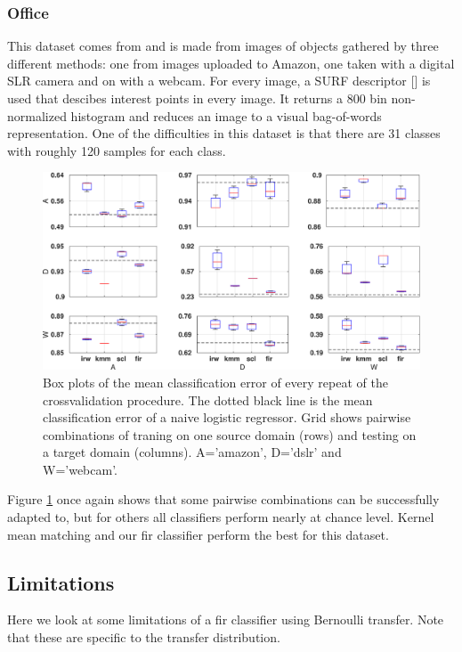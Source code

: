 \documentclass[twoside,11pt]{article}
\begin{document}
\subsubsection{Office}
This dataset comes from \cite{saenko2010adapting} and is made from images of objects gathered by three different methods: one from images uploaded to Amazon, one taken with a digital SLR camera and on with a webcam. For every image, a SURF descriptor [\cite{bay2006surf}] is used that descibes interest points in every image. It returns a 800 bin non-normalized histogram and reduces an image to a visual bag-of-words representation. One of the difficulties in this dataset is that there are 31 classes with roughly 120 samples for each class. 

\begin{figure}[ht]
	\centering
	\includegraphics[width=1\textwidth]{images/err_office_box.eps}
	\caption{Box plots of the mean classification error of every repeat of the crossvalidation procedure. The dotted black line is the mean classification error of a naive logistic regressor. Grid shows pairwise combinations of traning on one source domain (rows) and testing on a target domain (columns). A='amazon', D='dslr' and W='webcam'.}
	\label{err_office3}
\end{figure}

Figure \ref{err_office3} once again shows that some pairwise combinations can be successfully adapted to, but for others all classifiers perform nearly at chance level. Kernel mean matching and our fir classifier perform the best for this dataset.

\subsection{Limitations}
Here we look at some limitations of a fir classifier using Bernoulli transfer. Note that these are specific to the transfer distribution.
\end{document}
